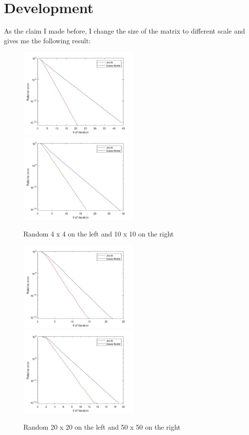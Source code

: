 \documentclass{article}
\begin{document}
\section{Development}
As the claim I made before, I change the size of the matrix to different scale and gives me the following result:
  \begin{figure}[ht]
  \centering
  \includegraphics[width=6cm]{randomcase44.jpg}
  \includegraphics[width=6cm]{randomcase1010.jpg}
  \caption{Random 4 x 4 on the left and 10 x 10 on the right}
  \includegraphics[width=6cm]{randomcase2020.jpg}
  \includegraphics[width=6cm]{randomcase5050.jpg}
  \caption{Random 20 x 20 on the left and 50 x 50 on the right}
   \end{figure}
   
\end{document}
